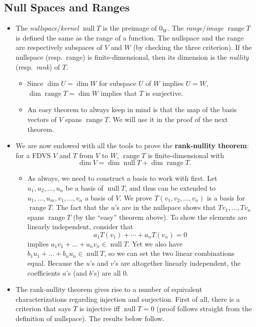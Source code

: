 \documentclass[11pt]{article}
\newcommand{\df}[1]{\textit{\textsf{#1}}}
\newcommand{\n}{\operatorname{null}}
\renewcommand{\r}{\operatorname{range}}
\renewcommand{\d}{\dim}
\begin{document}
\subsection{Null Spaces and Ranges}
\begin{itemize}
    \item The \df{nullspace}/\df{kernel} $\n T$ is the preimage of $0_W$. The \df{range}/\df{image} $\r T$ is defined the same as the range of a function. The nullspace and the range are respectively subspaces of $V$ and $W$ (by checking the three criterion). If the nullspace (resp.\ range) is finite-dimensional, then its dimension is the \df{nullity} (resp.\ \df{rank}) of $T$.
    \begin{itemize}
        \item Since $\d U = \d W$ for subspace $U$ of $W$ implies $U = W$, $\d \r T = \d W$ implies that $T$ is surjective.
        \item An easy theorem to always keep in mind is that the map of the basis vectors of $V$ spans $\r T$. We will use it in the proof of the next theorem.
    \end{itemize}
    \item We are now endowed with all the tools to prove the \textbf{rank-nullity theorem}: for a FDVS $V$ and $T$ from $V$ to $W$, $\r T$ is finite-dimensional with $$\d V = \d \n T + \d \r T.$$
    \begin{itemize}
        \item As always, we need to construct a basis to work with first. Let $u_1, u_2, \dots, u_n$ be a basis of $\n T$, and thus can be extended to $u_1,\dots,u_m,v_1,\dots,v_n$ a basis of $V$. We prove $T(v_1, v_2, \dots, v_n)$ is a basis for $\r T$. The fact that the $u$'s are in the nullspace shows that $Tv_1, \dots,Tv_n$ spans $\r T$ (by the ``easy'' theorem above). To show the elements are linearly independent, consider that $$a_1 T(v_1)+\cdots+a_n T(v_n) = 0$$ implies $a_1v_1+\dots+a_nv_n \in \n T$. Yet we also have $b_1u_1+\dots+b_nu_n \in \n T$, so we can set the two linear combinations equal. Because the $u$'s and $v$'s are altogether linearly independent, the coefficients $a$'s (and $b$'s) are all 0.
    \end{itemize}
    \item The rank-nullity theorem gives rise to a number of equivalent characterizations regarding injection and surjection. First of all, there is a criterion that says $T$ is injective iff $\n T = {0}$ (proof follows straight from the definition of nullspace). The results below follow.

\end{itemize}
\end{document}
